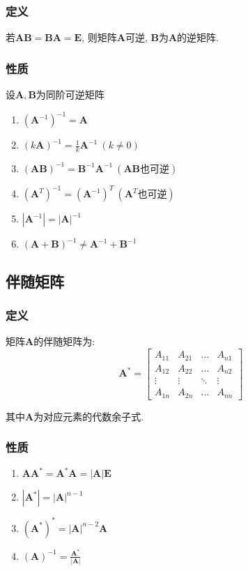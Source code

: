 \subsubsection{定义}
若$ \bm{A}\bm{B}=\bm{B}\bm{A}=\bm{E} $, 则矩阵$ \bm{A} $可逆, $ \bm{B} $为$ \bm{A} $的逆矩阵.
\subsubsection{性质}
设$ \bm{A}, \bm{B} $为同阶可逆矩阵
\begin{enumerate}
\item $ (\bm{A}^{-1})^{-1}=\bm{A} $
\item $ (k\bm{A})^{-1}=\frac{1}{k}\bm{A}^{-1}\ (k\neq 0) $
\item $ (\bm{A}\bm{B})^{-1}=\bm{B}^{-1}\bm{A}^{-1}\ (\bm{A}\bm{B}\text{也可逆}) $
\item $ (\bm{A}^{T})^{-1}=(\bm{A}^{-1})^{T}\ (\bm{A}^{T}\text{也可逆}) $
\item $ |\bm{A}^{-1}|=|\bm{A}|^{-1} $
\item $ (\bm{A}+\bm{B})^{-1}\neq \bm{A}^{-1}+\bm{B}^{-1} $
\end{enumerate}
\subsection{伴随矩阵}
\subsubsection{定义}
矩阵$ \bm{A} $的伴随矩阵为:
\begin{equation*}
\bm{A}^{*}=
\begin{bmatrix}
A_{11}	& A_{21} & \dots & A_{n1} \\
A_{12}	& A_{22} & \dots & A_{n2} \\
\vdots	& \vdots & \ddots & \vdots \\
A_{1n}	& A_{2n} & \dots & A_{nn}
\end{bmatrix}
\end{equation*}\par
其中$ \bm{A} $为对应元素的代数余子式.
\subsubsection{性质}
\begin{enumerate}
\item $ \bm{A}\bm{A}^{*}=\bm{A}^{*}\bm{A}=|\bm{A}|\bm{E} $
\item $ |\bm{A}^{*}|=|\bm{A}|^{n-1} $
\item $ (\bm{A}^{*})^{*}=|\bm{A}|^{n-2}\bm{A} $
\item $ (\bm{A})^{-1}=\frac{\bm{A}^{*}}{|\bm{A}|} $
\end{enumerate}

